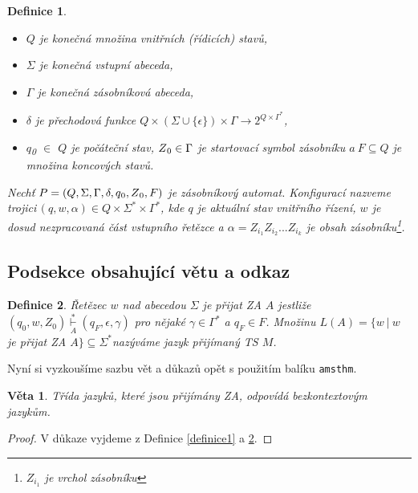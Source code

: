 \documentclass[11pt,a4paper,twocolumn]{article}
\newtheorem{definition}{Definice}
\newtheorem{sentence}{Věta}
\begin{document}
\begin{twocolumn}
\begin{definition}
			\begin{itemize}
				\item $Q$  je konečná \normalfont množina vnitřních (řídicích) stavů,
				\item $\Sigma$ \emph{je konečná} \normalfont vstupní abeceda,
				\item $\Gamma$ \emph{je konečná} zásobníková abeceda,
				\item $\delta$ \emph{je} přechodová funkce $Q \times (\Sigma \cup \{\epsilon\}) \times \Gamma \rightarrow 2^{Q \times \Gamma ^*}$,
				\item $q$\textsubscript{0} $\in$ $Q$ \emph{je} počáteční stav, $Z\textsubscript{0} \in \Gamma$ je startovací symbol zásobníku $a\ F \subseteq Q$ \emph{je množina} koncových stavů.
			\end{itemize}
		
		\normalfont Nechť $P = (Q, \Sigma, \Gamma, \delta, q\textsubscript{0}, Z\textsubscript{0}, F)$ je zásobníkový auto\-mat. \emph{Konfigurací} nazveme trojici\,$(q, w, \alpha)\in Q\times\Sigma^*\times\Gamma^*$, kde $q$ je aktuální stav vnitřního řízení, $w$ je dosud nezpra\-covaná část vstupního řetězce a $\alpha = Z_{i_1}Z_{i_2}...Z_{i_k}$ je obsah zásobníku\footnote{$Z_{i_1}$ je vrchol zásobníku}.
			\end{definition}
			
		
		
		\subsection{Podsekce obsahující větu a odkaz}
		
		\begin{definition}\label{definice2}
			 \normalfont Řetězec $w$ nad abecedou $\Sigma$ je přijat ZA $A$ \emph{jest\-liže $(q_{0}, w, Z_{0}) \underset{A}{\overset{*}{\vdash}} (q_{F}, \epsilon, \gamma)$ pro nějaké $\gamma \in \Gamma^*$ a $q_{F} \in F$. Množinu $L(A) = \{w\ |\  w$ je přijat ZA $A\} \subseteq \Sigma^* $nazýváme} \normalfont jazyk přijímaný TS $M$.
		\end{definition}
		Nyní si vyzkoušíme sazbu vět a důkazů opět s použitím balíku \texttt{amsthm}.
		
		\begin{sentence}
			Třída jazyků, které jsou přijímány ZA, odpovídá \normalfont bezkontextovým jazykům.
		\end{sentence} \vspace{-1em}
		\noindent \begin{proof}V důkaze vyjdeme z Definice \ref{definice1} a \ref{definice2}. \end{proof}

\end{twocolumn}
\end{document}
